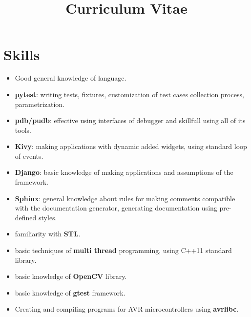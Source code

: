\documentclass[11pt,a4paper,sans]{moderncv} %
\title{Curriculum Vitae}
\begin{document}
\makecvtitle %


\section{Skills}

 {
    \begin{itemize}
    \item Good general knowledge of language.
    \item \textbf{pytest}: writing tests, fixtures, customization of test cases collection process, parametrization.
    \item \textbf{pdb/pudb}: effective using interfaces of debugger and skillfull using all of its tools.
    \item \textbf{Kivy}: making applications with dynamic added widgets, using standard loop of events.
    \item \textbf{Django}: basic knowledge of making applications and assumptions of the framework.
    \item \textbf{Sphinx}: general knowledge about rules for making comments compatible with the documentation generator, generating documentation using pre-defined styles.
    \end{itemize}
}
 {
    \begin{itemize}
    \item familiarity with \textbf{STL}.
    \item basic techniques of \textbf{multi thread} programming, using C++11 standard library.
    \item basic knowledge of \textbf{OpenCV} library.
    \item basic knowledge of \textbf{gtest} framework.
    \end{itemize}
}
 {\begin{itemize}
\item Creating and compiling programs for AVR microcontrollers using \textbf{avrlibc}.
\end{itemize}}
\end{document}
